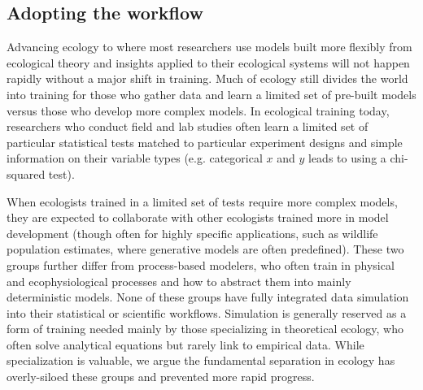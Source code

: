 \documentclass[11pt]{article}
\newcommand{\llabel}[1]{\hypertarget{lintarget:#1}{}\linelabel{lin:#1}}
\begin{document}
\subsection{Adopting the workflow}

Advancing ecology to where most researchers use models built more flexibly from ecological theory and insights applied to their ecological systems will not happen rapidly without a major shift in training. Much of ecology still divides the world into training for those who gather data and learn a limited set of pre-built models versus those who develop more complex models. In ecological training today, researchers who conduct field and lab studies often learn a limited set of particular statistical tests matched to particular experiment designs and simple information on their variable types (e.g. categorical $x$ and $y$ leads to using a chi-squared test).

When ecologists trained in a limited set of tests require more complex models, they are expected to collaborate with other ecologists \llabel{collab1} trained more in model development (though often for highly specific applications, such as wildlife population estimates, where generative models are often predefined). These two groups further differ from process-based modelers, who often train in physical and ecophysiological processes and how to abstract them into mainly deterministic models.
None of these groups have fully integrated data simulation into their statistical or scientific workflows. Simulation is generally reserved as a form of training needed mainly by those specializing in theoretical ecology, who often solve analytical equations but rarely link to empirical data. While specialization is valuable, we argue the fundamental %
separation in ecology has overly-siloed these groups and prevented more rapid progress.
\end{document}
